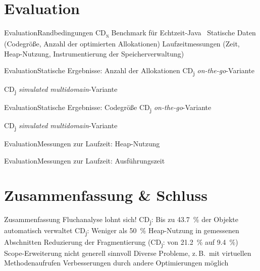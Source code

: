 \documentclass[usenames,dvipsnames,smaller]{beamer}
\begin{document}
	\section{Evaluation}
		\begin{frame}{Evaluation}{Randbedingungen}
			\bi
				\ii CD\textsubscript{x} Benchmark für Echtzeit-Java~\cite{kalibera:09:jtres}
					\bi
						\ii Statische Daten (Codegröße, Anzahl der optimierten Allokationen)
						\ii Laufzeitmessungen (Zeit, Heap-Nutzung, Instrumentierung der Speicherverwaltung)
					\ei
			\ei
		\end{frame}

		\begin{frame}{Evaluation}{Statische Ergebnisse: Anzahl der Allokationen}
			\bi
				\ii CD\textsubscript{j} \emph{on-the-go}-Variante\\
					\centerline{}
				\ii CD\textsubscript{j} \emph{simulated multidomain}-Variante\\
					\centerline{}
			\ei
		\end{frame}

		\begin{frame}{Evaluation}{Statische Ergebnisse: Codegröße}
			\bi
				\ii CD\textsubscript{j} \emph{on-the-go}-Variante\\
					\centerline{}
				\ii CD\textsubscript{j} \emph{simulated multidomain}-Variante\\
					\centerline{}
			\ei
		\end{frame}

		\begin{frame}{Evaluation}{Messungen zur Laufzeit: Heap-Nutzung}
			\centering
			
		\end{frame}

		\begin{frame}{Evaluation}{Messungen zur Laufzeit: Ausführungszeit}
			\centering
			
		\end{frame}

	\section{Zusammenfassung \& Schluss}
		\begin{frame}{Zusammenfassung}
			\bi
				\ii Fluchanalyse lohnt sich!
					\bi
						\ii CD\textsubscript{j}: Bis zu 43.7~\% der Objekte automatisch verwaltet
						\ii CD\textsubscript{j}: Weniger als 50~\% Heap-Nutzung in gemessenen Abschnitten
						\ii Reduzierung der Fragmentierung (CD\textsubscript{j}: von 21.2~\% auf 9.4~\%)
					\ei
				\ii Scope-Erweiterung nicht generell sinnvoll
					\bi
						\ii Diverse Probleme, z.\,B.\ mit virtuellen Methodenaufrufen
						\ii Verbesserungen durch andere Optimierungen möglich
					\ei
			\ei
		\end{frame}
\end{document}
